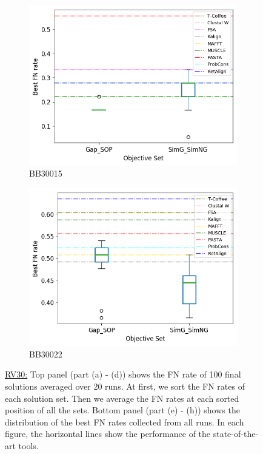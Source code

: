 \begin{figure}[!htbp]
\begin{adjustwidth}{-1cm}{-1cm}
\begin{subfigure}{0.22\textwidth}
			\includegraphics[width=\columnwidth]{Figure/summary/precomputedInit/Balibase/BB30015_objset_fnrate_rank}
			\caption{BB30015}
		\end{subfigure}
		\begin{subfigure}{0.22\textwidth}
			\includegraphics[width=\columnwidth]{Figure/summary/precomputedInit/Balibase/BB30022_objset_fnrate_rank}
			\caption{BB30022}
		\end{subfigure}
		\caption{\underline{RV30:} Top panel (part (a) - (d)) shows the FN rate of 100 final solutions averaged over 20 runs. At first, we sort the FN rates of each solution set. Then we average the FN rates at each sorted position of all the sets. Bottom panel (part (e) - (h)) shows the distribution of the best FN rates collected from all runs. In each figure, the horizontal lines show the performance of the state-of-the-art tools.}
		\label{fig:rv30_fn_rate}
	\end{adjustwidth}
\end{figure}


